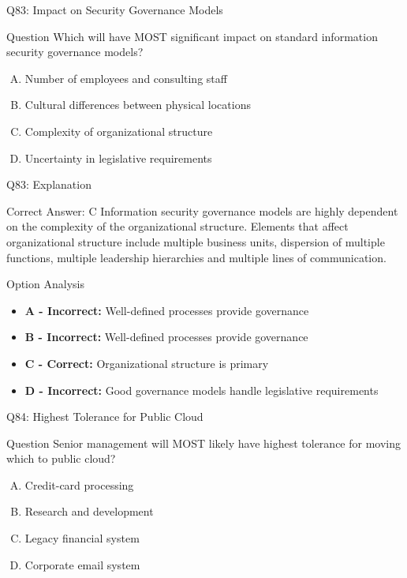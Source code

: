 \documentclass{beamer}
\begin{document}
	\begin{frame}{Q83: Impact on Security Governance Models}
		\begin{block}{Question}
			Which will have MOST significant impact on standard information security governance models?
		\end{block}
		\begin{enumerate}[(A)]
			\item Number of employees and consulting staff
			\item Cultural differences between physical locations
			\item Complexity of organizational structure
			\item Uncertainty in legislative requirements
		\end{enumerate}
	\end{frame}
	
	\begin{frame}{Q83: Explanation}
		\begin{block}{Correct Answer: C}
			Information security governance models are highly dependent on the complexity of the organizational structure. Elements that affect organizational structure include multiple business units, dispersion of multiple functions, multiple leadership hierarchies and multiple lines of communication.
		\end{block}
		\begin{block}{Option Analysis}
			\begin{itemize}
				\item \textbf{A - Incorrect:} Well-defined processes provide governance
				\item \textbf{B - Incorrect:} Well-defined processes provide governance
				\item \textbf{C - Correct:} Organizational structure is primary
				\item \textbf{D - Incorrect:} Good governance models handle legislative requirements
			\end{itemize}
		\end{block}
	\end{frame}
	
	\begin{frame}{Q84: Highest Tolerance for Public Cloud}
		\begin{block}{Question}
			Senior management will MOST likely have highest tolerance for moving which to public cloud?
		\end{block}
		\begin{enumerate}[(A)]
			\item Credit-card processing
			\item Research and development
			\item Legacy financial system
			\item Corporate email system
		\end{enumerate}
	\end{frame}
	
\end{document}
